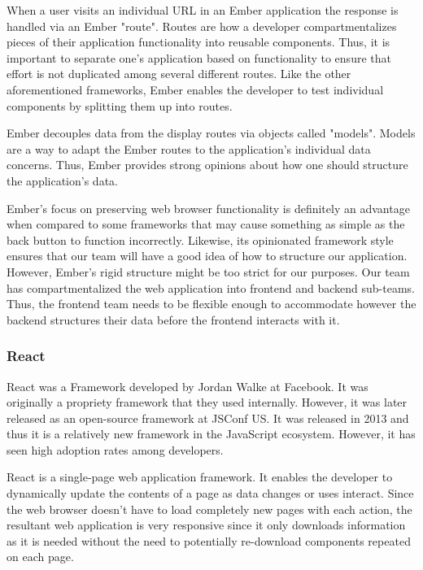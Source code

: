 \documentclass[12pt]{report}
\begin{document}
When a user visits an individual URL in an Ember application the response is handled via an Ember "route".\cite{emberrouting} Routes are how a developer compartmentalizes pieces of their application functionality into reusable components. Thus, it is important to separate one's application based on functionality to ensure that effort is not duplicated among several different routes. Like the other aforementioned frameworks, Ember enables the developer to test individual components by splitting them up into routes.

Ember decouples data from the display routes via objects called "models".\cite{embermodel} Models are a way to adapt the Ember routes to the application's individual data concerns. Thus, Ember provides strong opinions about how one should structure the application's data.

Ember's focus on preserving web browser functionality is definitely an advantage when compared to some frameworks that may cause something as simple as the back button to function incorrectly. Likewise, its opinionated framework style ensures that our team will have a good idea of how to structure our application. However, Ember's rigid structure might be too strict for our purposes. Our team has compartmentalized the web application into frontend and backend sub-teams. Thus, the frontend team needs to be flexible enough to accommodate however the backend structures their data before the frontend interacts with it.

\subsubsection*{React}

React was a Framework developed by Jordan Walke at Facebook. It was originally a propriety framework that they used internally. However, it was later released as an open-source framework at JSConf US.\cite{reactlaunch} It was released in 2013 and thus it is a relatively new framework in the JavaScript ecosystem.\cite{reactlaunch} However, it has seen high adoption rates among developers.

React is a single-page web application framework. It enables the developer to dynamically update the contents of a page as data changes or uses interact. Since the web browser doesn't have to load completely new pages with each action, the resultant web application is very responsive since it only downloads information as it is needed without the need to potentially re-download components repeated on each page.
\end{document}
